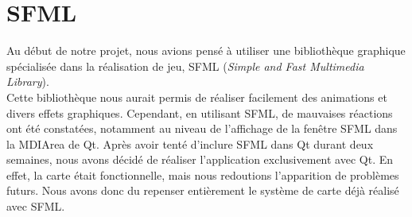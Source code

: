 \section{SFML}

Au début de notre projet, nous avions pensé à utiliser une bibliothèque graphique spécialisée dans la réalisation de jeu, SFML (\textit{Simple and Fast Multimedia Library}).\\

Cette bibliothèque nous aurait permis de réaliser facilement des animations et divers effets graphiques. 
Cependant, en utilisant SFML, de mauvaises réactions ont été constatées, notamment au niveau de l'affichage de la fenêtre SFML dans la MDIArea de Qt.
Après avoir tenté d'inclure SFML dans Qt durant deux semaines, nous avons décidé de réaliser l'application exclusivement avec Qt. En effet, la carte était fonctionnelle, mais nous redoutions l'apparition de problèmes futurs. Nous avons donc du repenser entièrement le système de carte déjà réalisé avec SFML.